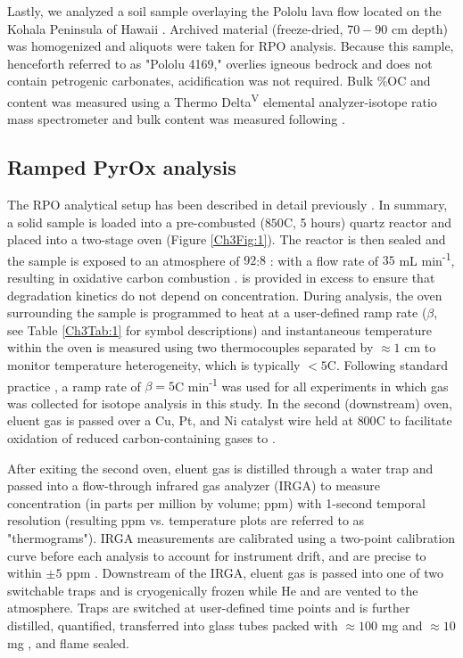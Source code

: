Lastly, we analyzed a soil sample overlaying the Pololu lava flow located on the Kohala Peninsula of Hawaii \citep[$20.15$\textdegree N, $155.83$\textdegree W;][]{Chadwick:2007hc}. Archived material (freeze-dried, $70 - 90$ cm depth) was homogenized and aliquots were taken for RPO analysis. Because this sample, henceforth referred to as "Pololu 4169," overlies igneous bedrock and does not contain petrogenic carbonates, acidification was not required. Bulk \%OC and  content was measured using a Thermo Delta\textsuperscript{V} elemental analyzer-isotope ratio mass spectrometer and bulk  content was measured following \citet{McNichol:1994ty}.

\subsection{Ramped PyrOx analysis}

The RPO analytical setup has been described in detail previously \citep{Rosenheim:2008ed,Hemingway:2016rc}. In summary, a solid sample is loaded into a pre-combusted ($850$\textdegree C, 5 hours) quartz reactor and placed into a two-stage oven (Figure \ref{Ch3Fig:1}). The reactor is then sealed and the sample is exposed to an atmosphere of $92$:$8$ : with a flow rate of $35$ mL min\textsuperscript{-1}, resulting in oxidative carbon combustion \citep[\textit{c.f.} pyrolysis as described in][]{Rosenheim:2008ed}.  is provided in excess to ensure that degradation kinetics do not depend on  concentration. During analysis, the oven surrounding the sample is programmed to heat at a user-defined ramp rate ($\beta$, see Table \ref{Ch3Tab:1} for symbol descriptions) and instantaneous temperature within the oven is measured using two thermocouples separated by $\approx 1$ cm to monitor temperature heterogeneity, which is typically $< 5$\textdegree C. Following standard practice \citep{Rosenheim:2008ed}, a ramp rate of $\beta = 5$\textdegree C min\textsuperscript{-1} was used for all experiments in which  gas was collected for isotope analysis in this study. In the second (downstream) oven, eluent gas is passed over a Cu, Pt, and Ni catalyst wire held at $800$\textdegree C to facilitate oxidation of reduced carbon-containing gases to . 

After exiting the second oven, eluent gas is distilled through a water trap and passed into a flow-through infrared gas analyzer (IRGA) to measure  concentration (in parts per million by volume; ppm) with 1-second temporal resolution (resulting ppm vs. temperature plots are referred to as "thermograms"). IRGA measurements are calibrated using a two-point calibration curve before each analysis to account for instrument drift, and are precise to within $\pm 5$ ppm \citep{Hemingway:2016rc}. Downstream of the IRGA, eluent gas is passed into one of two switchable traps and  is cryogenically frozen while He and  are vented to the atmosphere. Traps are switched at user-defined time points and  is further distilled, quantified, transferred into glass tubes packed with $\approx 100$ mg  and $\approx 10$ mg , and flame sealed. 

